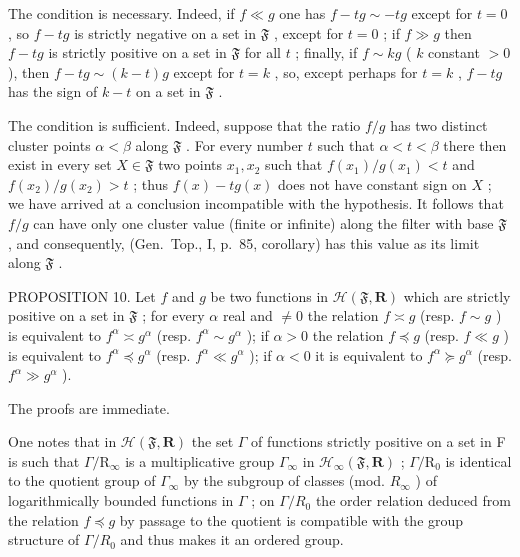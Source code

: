 The condition is necessary. Indeed, if \(f \ll g\) one has \(f - tg \sim -tg\) except for \(t = 0\) , so \(f - tg\) is strictly negative on a set in \(\mathfrak{F}\) , except for \(t = 0\) ; if \(f \gg g\) then \(f - tg\) is strictly positive on a set in \(\mathfrak{F}\) for all \(t\) ; finally, if \(f \sim kg\) ( \(k\) constant \(> 0\) ), then \(f - tg \sim (k - t)g\) except for \(t = k\) , so, except perhaps for \(t = k\) , \(f - tg\) has the sign of \(k - t\) on a set in \(\mathfrak{F}\) .

The condition is sufficient. Indeed, suppose that the ratio \(f / g\) has two distinct cluster points \(\alpha < \beta\) along \(\mathfrak{F}\) . For every number \(t\) such that \(\alpha < t < \beta\) there then exist in every set \(X \in \mathfrak{F}\) two points \(x_{1}, x_{2}\) such that \(f(x_{1}) / g(x_{1}) < t\) and \(f(x_{2}) / g(x_{2}) > t\) ; thus \(f(x) - tg(x)\) does not have constant sign on \(X\) ; we have arrived at a conclusion incompatible with the hypothesis. It follows that \(f / g\) can have only one cluster value (finite or infinite) along the filter with base \(\mathfrak{F}\) , and consequently, (Gen.~Top., I, p.~85, corollary) has this value as its limit along \(\mathfrak{F}\) .

PROPOSITION 10. Let \(f\) and \(g\) be two functions in \(\mathcal{H}(\mathfrak{F},\mathbf{R})\) which are strictly positive on a set in \(\mathfrak{F}\) ; for every \(\alpha\) real and \(\neq 0\) the relation \(f\asymp g\) (resp. \(f\sim g\) ) is equivalent to \(f^{\alpha}\asymp g^{\alpha}\) (resp. \(f^{\alpha}\sim g^{\alpha}\) ); if \(\alpha >0\) the relation \(f\preccurlyeq g\) (resp. \(f\ll g\) ) is equivalent to \(f^{\alpha}\preccurlyeq g^{\alpha}\) (resp. \(f^{\alpha}\ll g^{\alpha}\) ); if \(\alpha < 0\) it is equivalent to \(f^{\alpha}\succcurlyeq g^{\alpha}\) (resp. \(f^{\alpha}\gg g^{\alpha}\) ).

The proofs are immediate.

One notes that in \(\mathcal{H}(\mathfrak{F},\mathbf{R})\) the set \(\varGamma\) of functions strictly positive on a set in F is such that \(\varGamma/\mathrm{R}_{\infty}\) is a multiplicative group \(\varGamma_{\infty}\) in \(\mathcal{H}_{\infty}(\mathfrak{F},\mathbf{R})\) ; \(\varGamma/\mathrm{R}_{0}\) is identical to the quotient group of \(\varGamma_{\infty}\) by the subgroup of classes (mod. \(R_{\infty}\) ) of logarithmically bounded functions in \(\varGamma\) ; on \(\varGamma/R_{0}\) the order relation deduced from the relation \(f \preccurlyeq g\) by passage to the quotient is compatible with the group structure of \(\varGamma/R_{0}\) and thus makes it an ordered group.

